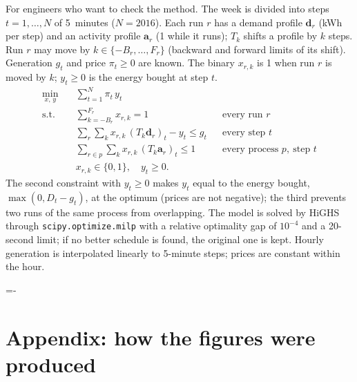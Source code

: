 \documentclass[10pt,a4paper]{scrartcl}
\makeatletter
\newcommand{\NeedSpace}[1]{\par\begingroup\dimen@=\pagegoal\advance\dimen@-\pagetotal
    \ifdim\dimen@<#1\relax\newpage\fi\endgroup}
\newcommand{\RuleSection}[1]{%
    \NeedSpace{10\baselineskip}%
    \section{#1}%
    \vspace{0.2em}{\color{accent!35}\hrule height 0.4pt}\vspace{0.3em}%
  }
\makeatother
\begin{document}
  For engineers who want to check the method. The week is divided into steps $t=1,\dots,N$ of
  5~minutes ($N=2016$). Each run $r$ has a demand profile $\bm{d}_r$ (kWh per step) and an activity
  profile $\bm{a}_r$ (1 while it runs); $T_k$ shifts a profile by $k$ steps. Run $r$ may move by
  $k \in \{-B_r,\dots,F_r\}$ (backward and forward limits of its shift). Generation $g_t$ and price
  $\pi_t \ge 0$ are known. The binary $x_{r,k}$ is 1 when run $r$ is moved by $k$; $y_t \ge 0$ is the
  energy bought at step $t$.
  \begin{equation*}
    \begin{aligned}
      \min_{x,\,y}\quad & \sum_{t=1}^{N} \pi_t\, y_t \\
      \text{s.t.}\quad & \sum_{k=-B_r}^{F_r} x_{r,k} = 1 && \text{every run } r \\
      & \sum_{r}\sum_{k} x_{r,k}\,(T_k \bm{d}_r)_t - y_t \le g_t && \text{every step } t \\
      & \sum_{r \in p}\sum_{k} x_{r,k}\,(T_k \bm{a}_r)_t \le 1 && \text{every process } p,\ \text{step } t \\
      & x_{r,k} \in \{0,1\},\quad y_t \ge 0.
    \end{aligned}
  \end{equation*}
  The second constraint with $y_t \ge 0$ makes $y_t$ equal to the energy bought,
  $\max(0, D_t - g_t)$, at the optimum (prices are not negative); the third prevents two runs of the
  same process from overlapping. The model is solved by HiGHS through \texttt{scipy.optimize.milp}
  with a relative optimality gap of $10^{-4}$ and a 20-second limit; if no better schedule is found,
  the original one is kept. Hourly generation is interpolated linearly to 5-minute steps; prices
  are constant within the hour.

  \RuleSection{Appendix: how the figures were produced}
  \label{app:method}
\end{document}
